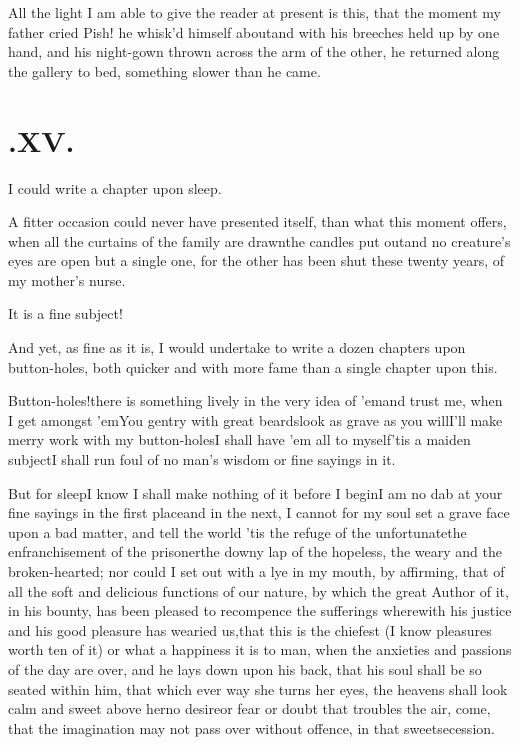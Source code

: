 \documentclass[twoside]{article}
\begin{document}
All the light I am able to give the reader at present is this,
that the moment my father cried Pish! he whisk’d himself
about\tsk and with his breeches held up by one hand, and his
night-gown thrown across the arm of the other, he returned along the
gallery to bed, something slower than he came.

\medskip
\section{.\enspace XV.}

 I could write a chapter upon\break
sleep.

A fitter occasion could never have presented itself, than what
this moment offers, when all the curtains of the family are
drawn\tsk the candles put out\tsk and no creature’s eyes
are open but a single one, for the other has been shut these twenty
years, of my mother’s nurse.

It is a fine subject!

And yet, as fine as it is, I would undertake to write a dozen chapters upon
button-holes, both quicker and with\break
more fame than a single chapter upon this.

Button-holes!\tsh there is something\break
lively in the very idea of ’em\tsk and trust\break
me, when I get amongst ’em\tsk You\break
gentry with great beards\tsh look as\break
grave as you will\tsh I’ll make merry\break
work with my button-holes\tsk I shall have
’em all to myself\tsk ’tis a maiden subject\break\tsk I shall run
foul of no man’s wisdom or fine sayings in it.

But for sleep\tsk I know I shall make nothing of it before I begin\tsk I am no dab at
your fine sayings in the first place\break\tsk and in the
next, I cannot for my soul
set a grave face upon a bad matter, and tell the world\tsk
’tis the refuge of the unfortunate\tsk the enfranchisement
of the prisoner\tsk the downy lap of the hopeless, the
weary and the broken-hearted; nor could I set out with a
lye in my mouth, by affirming, that of all the soft and
delicious functions of our nature, by which the great Author
of it, in his bounty, has been pleased to recompence the
sufferings wherewith his justice and his good pleasure has
wearied us,\tsh that this is the chiefest (I know pleasures
worth ten of it) or what a happiness it is to man, when the
anxieties and passions of the day are over, and he lays down
upon his back, that his soul shall be so seated within him,
that which ever way she turns her eyes, the heavens shall
look calm and sweet above her\tsk no desire\tsk or fear\tsk
or doubt that troubles the air,
 come, that the imagination may not\break
pass over without offence, in that sweet\break secession.
\end{document}
